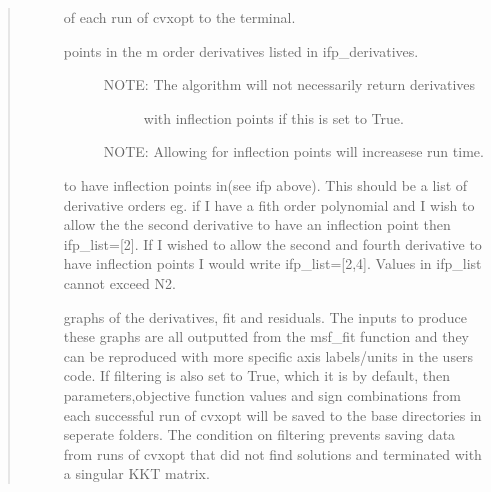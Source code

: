 \documentclass[letterpaper,10pt,english]{sphinxmanual}
\begin{document}
\begin{fulllineitems}
\begin{quote}
\begin{description}
\begin{description}
\item[{}] \leavevmode
of each run of cvxopt to the terminal.

\item[{}] \leavevmode\begin{description}
\item[{points in the m order derivatives listed in ifp\_derivatives.}] \leavevmode\begin{description}
\item[{NOTE: The algorithm will not necessarily return derivatives}] \leavevmode
with inflection points if this is set to True.

\end{description}

NOTE: Allowing for inflection points will increasese run time.

\end{description}

\item[{}] \leavevmode
to have inflection points in(see ifp above). This should be a list
of derivative orders eg. if I have a fith order
polynomial and I wish to allow the the second derivative to have
an inflection point then ifp\_list={[}2{]}. If I wished to allow the
second and fourth derivative to have inflection points
I would write ifp\_list={[}2,4{]}. Values in ifp\_list cannot exceed N\sphinxhyphen{}2.

\item[{}] \leavevmode
graphs of the derivatives, fit and residuals. The inputs to
produce these graphs are all outputted from the msf\_fit function
and they can be reproduced with more specific axis labels/units in
the users code. If filtering is also set to True, which it is by
default, then parameters,objective function values and sign
combinations from each successful run of cvxopt will be saved
to the base directories in seperate folders. The condition on
filtering prevents saving data from runs of cvxopt that did not
find solutions and terminated with a singular KKT matrix.

\end{description}

\end{description}\end{quote}

\end{fulllineitems}
\end{document}
